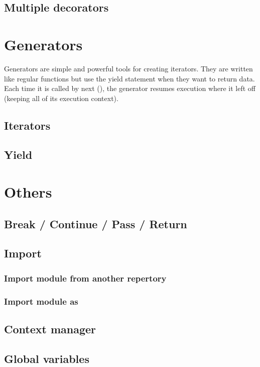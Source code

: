 \documentclass[a4paper, 12pt]{article}
\begin{document}
\subsection{Multiple decorators}

\newpage
\section{Generators}
\label{sec:Generators}
Generators are simple and powerful tools for creating iterators. They are written like regular functions but use the yield statement when they want to return data. Each time it is called by next (), the generator resumes execution where it left off (keeping all of its execution context).\newline
\subsection{Iterators}
\subsection{Yield}

\newpage
\section{Others}
\subsection{Break / Continue / Pass / Return}
\label{subsec:BCPR}
\subsection{Import}
\label{subsec:Import}
\subsubsection{Import module from another repertory}
\subsubsection{Import module as}
\label{As}
\subsection{Context manager}
\label{subsec:ContextManager}
\subsection{Global variables}
\label{subsec:Global}
\end{document}
